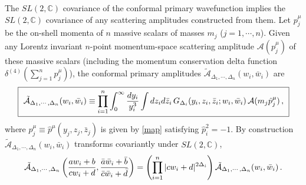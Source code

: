 \documentclass[12pt]{article}
\numberwithin{equation}{section}
\begin{document}
The $SL(2,\mathbb{C})$ covariance of the conformal primary wavefunction  implies the  $SL(2,\mathbb{C})$ covariance of any scattering amplitudes constructed from them. 
Let $p^\mu_j$ be the on-shell momenta of $n$ massive scalars of masses $m_j$ ($j=1,\cdots, n$).    
Given any Lorentz invariant $n$-point momentum-space scattering amplitude $\mathcal{A}(p_j^\mu)$ of these massive scalars (including the momentum conservation delta function $\delta^{(4)}(\sum_{j=1}^n  p_j^\mu)$), the conformal primary amplitudes $\mathcal{\tilde A}_{\Delta_1,\cdots,\Delta_n}(w_i,\bar w_i)$ are  \begin{align}
\boxed{~
\mathcal{\tilde A}_{\Delta_1,\cdots,\Delta_n}(w_i,\bar w_i) 
\equiv \prod_{i=1}^n \int_0^\infty {dy_i\over y_i^3}  \int dz_i d\bar z_i\,
G_{\Delta_i} (y_i,z_i, \bar z_i; w_i ,\bar w_i)\,\mathcal{A}(m_j \hat p_j^\mu)\,,~}
\end{align}
where $\hat p_j^\mu \equiv \hat p^\mu (y_j,z_j,\bar z_j)$  is given by \eqref{map} satisfying $\hat p_i^2=-1$.  By construction $\mathcal{\tilde A}_{\Delta_1,\cdots,\Delta_n}(w_i,\bar w_i)$  transforms covariantly under $SL(2,\mathbb{C})$,
\begin{align}
\mathcal{\tilde A}_{\Delta_1,\cdots,\Delta_n}\left({ aw_i +b\over cw_i+d},{\bar a\bar w_i+\bar b\over \bar c\bar w_i+\bar d}\right) =\left( \prod_{i=1}^n |c w_i +d|^{2\Delta_i} \right) \mathcal{\tilde A}_{\Delta_1,\cdots,\Delta_n}(w_i,\bar w_i)\,.
\end{align}
\end{document}
